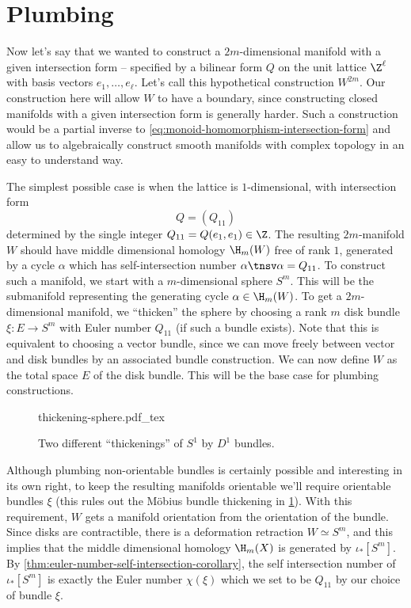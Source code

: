 
\begin{definition}
\end{definition}

\section{Plumbing}\label{sec:plumbing}

Now let's say that we wanted to construct a $2m$-dimensional manifold with a given intersection form -- specified by a bilinear form $Q$ on the unit lattice $\Z^\ell$ with basis vectors $e_1,\ldots, e_\ell$. Let's call this hypothetical construction $W^{2m}$. Our construction here will allow $W$ to have a boundary, since constructing closed manifolds with a given intersection form is generally harder.
Such a construction would be a partial inverse to \cref{eq:monoid-homomorphism-intersection-form} and allow us to algebraically construct smooth manifolds with complex topology in an easy to understand way.

The simplest possible case is when the lattice is $1$-dimensional, with intersection form
\[
	Q =  (Q_{11})
\]
determined by the single integer $Q_{11}=Q(e_1,e_1)\in \Z$.
The resulting $2m$-manifold $W$ should have middle dimensional homology $\H_m(W)$ free of rank $1$, generated by a cycle $\alpha$ which has self-intersection number $\alpha\tnsv \alpha = Q_{11}$. To construct such a manifold, we start with a $m$-dimensional sphere $S^m$. This will be the submanifold representing the generating cycle $\alpha\in \H_m(W)$. To get a $2m$-dimensional manifold, we ``thicken'' the sphere by choosing a rank $m$ disk bundle $\xi : E \to S^m$ with Euler number $Q_{11}$ (if such a bundle exists). Note that this is equivalent to choosing a vector bundle, since we can move freely between vector and disk bundles by an associated bundle construction. We can now define $W$ as the total space $E$ of the disk bundle. This will be the base case for plumbing constructions.
\begin{figure}[ht]
	\centering
	{thickening-sphere.pdf_tex}
	\caption{Two different ``thickenings'' of $S^1$ by $D^1$ bundles.}\label{fig:thickening-sphere}
\end{figure}

Although plumbing non-orientable bundles is certainly possible and interesting in its own right, to keep the resulting manifolds orientable we'll require orientable bundles $\xi$ (this rules out the M\"obius bundle thickening in \cref{fig:thickening-sphere}). With this requirement, $W$ gets a manifold orientation from the orientation of the bundle.
Since disks are contractible, there is a deformation retraction $W\simeq S^m$, and this implies that the middle dimensional homology $\H_m(X)$ is generated by $\iota_*[S^m]$. By \cref{thm:euler-number-self-intersection-corollary}, the self intersection number of $\iota_*[S^m]$ is exactly the Euler number $\chi(\xi)$ which we set to be $Q_{11}$ by our choice of bundle $\xi$.

